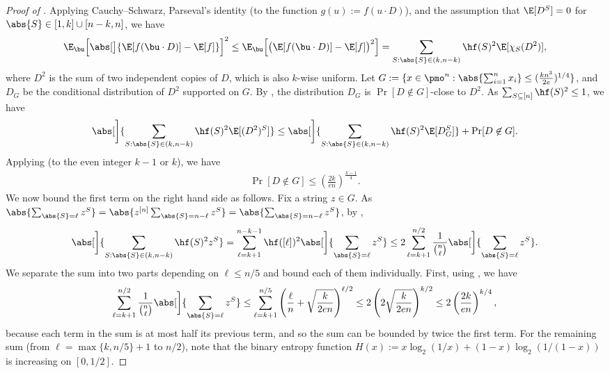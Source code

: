\begin{proof}[Proof of ]
  Applying Cauchy--Schwarz, Parseval's identity (to the function $g(u) := f(u \cdot D)$), and the assumption that $\E[D^S] = 0$ for $\abs{S} \in [1,k] \cup [n-k,n]$, we have
  \[
    \E_{\bu}\Bigl[ \abs[\big]{ \E[f(\bu \cdot D)] - \E[f] } \Bigr]^2
    \le \E_{\bu}\Bigl[ \bigl( \E[f(\bu \cdot D)] - \E[f] \bigr)^2 \Bigr]
    = \sum_{S: \abs{S} \in (k,n-k)} \hf(S)^2 \E[\chi_S(D^2)] ,
  \]
  where $D^2$ is the sum of two independent copies of $D$, which is also $k$-wise uniform.
  Let $G := \{x \in \pmo^n : \abs{\sum_{i=1}^n x_i} \le (\frac{kn^3}{2e})^{1/4} \}$, and $D_G$ be the conditional distribution of $D^2$ supported on $G$.
  By , the distribution $D_G$ is $\Pr[D\notin G]$-close to $D^2$.
  As $\sum_{S \subseteq [n]} \hf(S)^2 \le 1$, we have
  \[
    \abs[\bigg]{ \sum_{S: \abs{S} \in (k,n-k)} \hf(S)^2 \E[(D^2)^S] }
    \le \abs[\bigg]{ \sum_{S: \abs{S} \in (k,n-k)} \hf(S)^2 \E[D_G^S] } + \Pr[D \not\in G] .
  \]
  Applying  (to the even integer $k-1$ or $k$), we have
  \begin{align} \label{eq:Bazzi-tail}
    \Pr[ D \notin G ]
    \le \left( \frac{2k}{en} \right)^{\frac{k-1}{4}} .
  \end{align}
  We now bound the first term on the right hand side as follows.
  Fix a string $z \in G$.
  As $\abs{\sum_{\abs{S}=\ell} z^S} = \abs{ z^{[n]} \sum_{\abs{S}=n-\ell} z^S} = \abs{\sum_{\abs{S}=n-\ell} z^S}$, by , 
  \[
    \abs[\bigg]{ \sum_{S: \abs{S} \in (k,n-k)} \hf(S)^2 z^S }
    = \sum_{\ell=k+1}^{n-k-1} \hf([\ell])^2 \abs[\bigg]{\sum_{\abs{S}=\ell} z^S}
    \le 2 \sum_{\ell=k+1}^{n/2} \frac{1}{\binom{n}{\ell}} \abs[\bigg]{\sum_{\abs{S}=\ell} z^S} .
  \]
  We separate the sum into two parts depending on $\ell \le n/5$ and bound each of them individually.
  First, using , we have
  \begin{align} \label{eq:Bazzi-1}
    \sum_{\ell=k+1}^{n/2} \frac{1}{\binom{n}{\ell}} \abs[\bigg]{\sum_{\abs{S}=\ell} z^S}
    \le \sum_{\ell=k+1}^{n/5} \left( \frac{\ell}{n} + \sqrt{\frac{k}{2en}} \right)^{\ell/2}
    \le 2 \left( 2 \sqrt{\frac{k}{2en}} \right)^{k/2} 
    \le 2 \left( \frac{2k}{en} \right)^{k/4} ,
  \end{align}
  because each term in the sum is at most half its previous term, and so the sum can be bounded by twice the first term.
  For the remaining sum (from $\ell=\max\{k,n/5\}+1$ to $n/2$), note that the binary entropy function $H(x) := x \log_2(1/x) + (1-x) \log_2(1/(1-x))$ is increasing on $[0,1/2]$.

\end{proof}
